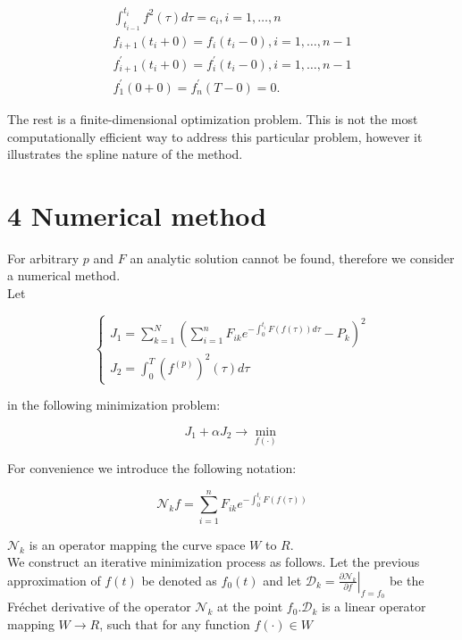 \documentclass[10pt]{article}
\begin{document}
\begin{gather*}
\int_{t_{i-1}}^{t_{i}} f^{2}(\tau) d \tau=c_{i}, i=1, \ldots, n  \tag{15}\\
f_{i+1}\left(t_{i}+0\right)=f_{i}\left(t_{i}-0\right), i=1, \ldots, n-1  \tag{16}\\
f_{i+1}^{\prime}\left(t_{i}+0\right)=f_{i}^{\prime}\left(t_{i}-0\right), i=1, \ldots, n-1  \tag{17}\\
f_{1}^{\prime}(0+0)=f_{n}^{\prime}(T-0)=0 . \tag{18}
\end{gather*}


The rest is a finite-dimensional optimization problem. This is not the most computationally efficient way to address this particular problem, however it illustrates the spline nature of the method.

\section*{4 Numerical method}
For arbitrary $p$ and $F$ an analytic solution cannot be found, therefore we consider a numerical method.\\
Let

$$
\left\{\begin{array}{l}
J_{1}=\sum_{k=1}^{N}\left(\sum_{i=1}^{n} F_{i k} e^{-\int_{0}^{t_{i}} F(f(\tau)) d \tau}-P_{k}\right)^{2} \\
J_{2}=\int_{0}^{T}\left(f^{(p)}\right)^{2}(\tau) d \tau
\end{array}\right.
$$

in the following minimization problem:


\begin{equation*}
J_{1}+\alpha J_{2} \rightarrow \min _{f(\cdot)} \tag{19}
\end{equation*}


For convenience we introduce the following notation:


\begin{equation*}
\mathcal{N}_{k} f=\sum_{i=1}^{n} F_{i k} e^{-\int_{0}^{t_{i}} F(f(\tau))} \tag{20}
\end{equation*}


$\mathcal{N}_{k}$ is an operator mapping the curve space $W$ to $R$.\\
We construct an iterative minimization process as follows. Let the previous approximation of $f(t)$ be denoted as $f_{0}(t)$ and let $\mathcal{D}_{k}=\left.\frac{\partial \mathcal{N}_{k}}{\partial f}\right|_{f=f_{0}}$ be the Fréchet derivative of the operator $\mathcal{N}_{k}$ at the point $f_{0} . \mathcal{D}_{k}$ is a linear operator mapping $W \rightarrow R$, such that for any function $f(\cdot) \in W$
\end{document}
